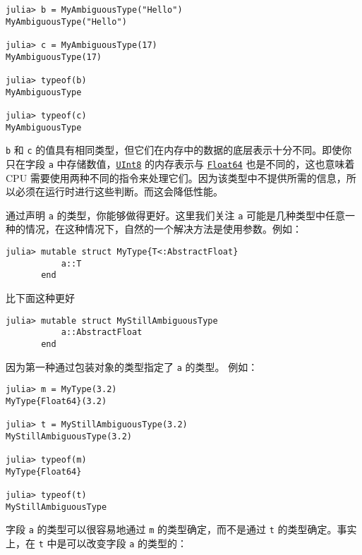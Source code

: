 \begin{verbatim}
julia> b = MyAmbiguousType("Hello")
MyAmbiguousType("Hello")

julia> c = MyAmbiguousType(17)
MyAmbiguousType(17)

julia> typeof(b)
MyAmbiguousType

julia> typeof(c)
MyAmbiguousType
\end{verbatim}



\texttt{b} 和 \texttt{c} 的值具有相同类型，但它们在内存中的数据的底层表示十分不同。即使你只在字段 \texttt{a} 中存储数值，\hyperlink{6609065134969660118}{\texttt{UInt8}} 的内存表示与 \hyperlink{5027751419500983000}{\texttt{Float64}} 也是不同的，这也意味着 CPU 需要使用两种不同的指令来处理它们。因为该类型中不提供所需的信息，所以必须在运行时进行这些判断。而这会降低性能。



通过声明 \texttt{a} 的类型，你能够做得更好。这里我们关注 \texttt{a} 可能是几种类型中任意一种的情况，在这种情况下，自然的一个解决方法是使用参数。例如：




\begin{verbatim}
julia> mutable struct MyType{T<:AbstractFloat}
           a::T
       end
\end{verbatim}



比下面这种更好




\begin{verbatim}
julia> mutable struct MyStillAmbiguousType
           a::AbstractFloat
       end
\end{verbatim}



因为第一种通过包装对象的类型指定了 \texttt{a} 的类型。 例如：




\begin{verbatim}
julia> m = MyType(3.2)
MyType{Float64}(3.2)

julia> t = MyStillAmbiguousType(3.2)
MyStillAmbiguousType(3.2)

julia> typeof(m)
MyType{Float64}

julia> typeof(t)
MyStillAmbiguousType
\end{verbatim}



字段 \texttt{a} 的类型可以很容易地通过 \texttt{m} 的类型确定，而不是通过 \texttt{t} 的类型确定。事实上，在 \texttt{t} 中是可以改变字段 \texttt{a} 的类型的：




